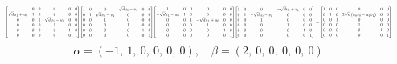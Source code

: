 \documentclass[11pt]{article}
\theoremstyle{definition}
\begin{document}
\[
\scaletoalign{\textwidth}{{\left[\begin{matrix}1 & 0 & 0 & 0 & 0 & 0\\\sqrt{d} u_{1} + u_{0} & 1 & 0 & 0 & 0 & 0\\0 & 0 & 1 & \sqrt{d} u_{1} - u_{0} & 0 & 0\\0 & 0 & 0 & 1 & 0 & 0\\0 & 0 & 0 & 0 & 1 & 0\\0 & 0 & 0 & 0 & 0 & 1\end{matrix}\right]} {\left[\begin{matrix}1 & 0 & 0 & \sqrt{d} v_{0} - v_{1} & 0 & 0\\0 & 1 & \sqrt{d} v_{0} + v_{1} & 0 & 0 & 0\\0 & 0 & 1 & 0 & 0 & 0\\0 & 0 & 0 & 1 & 0 & 0\\0 & 0 & 0 & 0 & 1 & 0\\0 & 0 & 0 & 0 & 0 & 1\end{matrix}\right]} {\left[\begin{matrix}1 & 0 & 0 & 0 & 0 & 0\\- \sqrt{d} u_{1} - u_{0} & 1 & 0 & 0 & 0 & 0\\0 & 0 & 1 & - \sqrt{d} u_{1} + u_{0} & 0 & 0\\0 & 0 & 0 & 1 & 0 & 0\\0 & 0 & 0 & 0 & 1 & 0\\0 & 0 & 0 & 0 & 0 & 1\end{matrix}\right]} {\left[\begin{matrix}1 & 0 & 0 & - \sqrt{d} v_{0} + v_{1} & 0 & 0\\0 & 1 & - \sqrt{d} v_{0} - v_{1} & 0 & 0 & 0\\0 & 0 & 1 & 0 & 0 & 0\\0 & 0 & 0 & 1 & 0 & 0\\0 & 0 & 0 & 0 & 1 & 0\\0 & 0 & 0 & 0 & 0 & 1\end{matrix}\right]} = {\left[\begin{matrix}1 & 0 & 0 & 0 & 0 & 0\\0 & 1 & 0 & 2 \sqrt{d} \left(u_{0} v_{0} - u_{1} v_{1}\right) & 0 & 0\\0 & 0 & 1 & 0 & 0 & 0\\0 & 0 & 0 & 1 & 0 & 0\\0 & 0 & 0 & 0 & 1 & 0\\0 & 0 & 0 & 0 & 0 & 1\end{matrix}\right]}}
\]
\[
\alpha = \left( -1, \  1, \  0, \  0, \  0, \  0\right), \quad \beta = \left( 2, \  0, \  0, \  0, \  0, \  0\right)
\]
\end{document}
